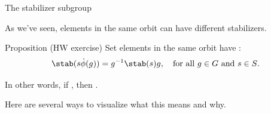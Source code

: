 \documentclass[8pt, handout]{beamer}
\newcommand{\Pause}{}      %
\begin{document}

\begin{frame}[fragile]{The stabilizer subgroup}
  
  As we've seen, elements in the same orbit can have different stabilizers.

  \smallskip\Pause
  
  \begin{block}{Proposition (HW exercise)}
    Set elements in the same orbit have :
    \[
    \stab(s\Dot\phi(g))=g^{-1}\stab(s)g,\quad\text{for all $g\in G$ and $s\in
    S$}.
    \] 
  \end{block}

  \smallskip\Pause
  
  In other words, if , then
  . \medskip\Pause

  Here are several ways to visualize what this means and why. \vspace{-3mm}
  

\end{frame}
\end{document}
